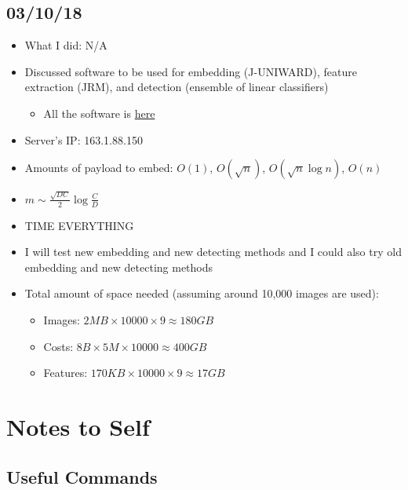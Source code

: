 \documentclass[11pt,a4paper]{report}
\begin{document}
\section{03/10/18}

\begin{itemize}

\item What I did: N/A

\item Discussed software to be used for embedding (J-UNIWARD), feature extraction (JRM), and detection (ensemble of linear classifiers)
  \begin{itemize}
  \item All the software is \href{http://dde.binghamton.edu/download/stego_algorithms/}{here}
  \end{itemize}

\item Server's IP: 163.1.88.150

\item Amounts of payload to embed: $O(1)$, $O(\sqrt{n})$, $O(\sqrt{n} \log n)$, $O(n)$

\item $m \sim \frac{\sqrt{DC}}{2} \log \frac{C}{D}$

\item TIME EVERYTHING

\item I will test new embedding and new detecting methods and I could also try old embedding and new detecting methods

\item Total amount of space needed (assuming around 10,000 images are used):
  \begin{itemize}
  \item Images: $2MB \times 10000 \times 9 \approx 180GB$
  \item Costs: $8B \times 5M \times 10000 \approx 400 GB$
  \item Features: $170KB \times 10000 \times 9 \approx 17GB$
  \end{itemize}

\end{itemize}


\chapter{Notes to Self}

\section{Useful Commands}
\end{document}
